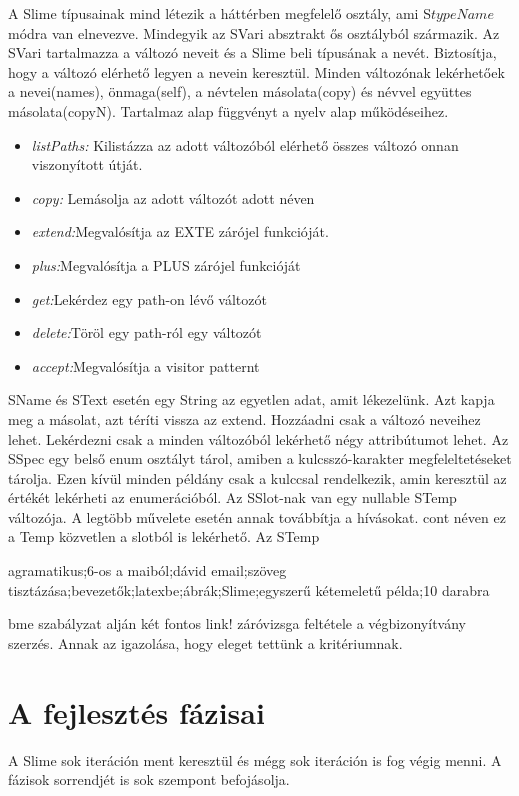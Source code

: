 {A Slime típusainak mind létezik a háttérben megfelelő osztály, ami S{$ typeName $} módra van elnevezve. 
Mindegyik az SVari absztrakt ős osztályból származik.
Az SVari tartalmazza a változó neveit és a Slime beli típusának a nevét.
Biztosítja, hogy a változó elérhető legyen a nevein keresztül.
Minden változónak lekérhetőek a nevei(names), önmaga(self), a névtelen másolata(copy) és névvel együttes másolata(copyN).
Tartalmaz alap függvényt a nyelv alap működéseihez.
\begin{itemize}
\item \emph{listPaths:} Kilistázza az adott változóból elérhető összes változó onnan viszonyított útját.
\item \emph{copy:} Lemásolja az adott változót adott néven
\item \emph{extend:}Megvalósítja az EXTE zárójel funkcióját.
\item \emph{plus:}Megvalósítja a PLUS zárójel funkcióját
\item \emph{get:}Lekérdez egy path-on lévő változót
\item \emph{delete:}Töröl egy path-ról egy változót
\item \emph{accept:}Megvalósítja a visitor patternt
\end{itemize}

SName és SText esetén egy String az egyetlen adat, amit lékezelünk. Azt kapja meg a másolat, azt téríti vissza az extend. Hozzáadni csak a változó neveihez lehet. Lekérdezni csak a minden változóból lekérhető négy attribútumot lehet.
Az SSpec egy belső enum osztályt tárol, amiben a kulcsszó-karakter megfeleltetéseket tárolja. Ezen kívül minden példány csak a kulccsal rendelkezik, amin keresztül az értékét lekérheti az enumerációból.
Az SSlot-nak van egy nullable STemp változója. A legtöbb művelete esetén annak továbbítja a hívásokat. cont néven ez a Temp közvetlen a slotból is lekérhető.
Az STemp


agramatikus;6-os a maiból;dávid email;szöveg tisztázása;bevezetők;latexbe;ábrák;Slime;egyszerű kétemeletű példa;10 darabra

bme szabályzat alján két fontos link!
záróvizsga feltétele a végbizonyítvány szerzés.
Annak az igazolása, hogy eleget tettünk a kritériumnak.




\section{A fejlesztés fázisai}
A Slime sok iteráción ment keresztül és mégg sok iteráción is fog végig menni. 
A fázisok sorrendjét is sok szempont befojásolja.

}
